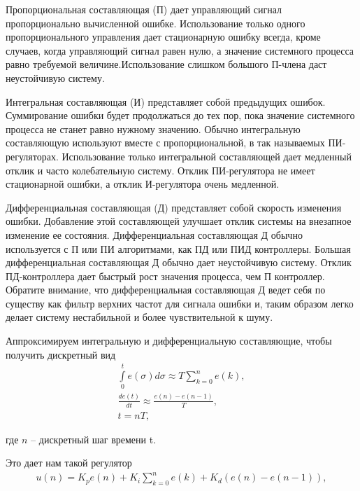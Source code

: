         Пропорциональная составляющая (П) дает управляющий сигнал
        пропорционально вычисленной ошибке. Использование только одного
        пропорционального управления дает стационарную ошибку всегда, кроме
        случаев, когда управляющий сигнал равен нулю, а значение системного
        процесса равно требуемой величине.Использование слишком большого
        П-члена даст неустойчивую систему. 

        Интегральная составляющая (И) представляет собой предыдущих ошибок.
        Суммирование ошибки будет продолжаться до тех пор, пока значение
        системного процесса не станет равно нужному значению. Обычно
        интегральную составляющую используют вместе с пропорциональной, в так
        называемых ПИ-регуляторах. Использование только интегральной
        составляющей дает медленный отклик и часто колебательную систему.
        Отклик ПИ-регулятора не имеет стационарной ошибки, а отклик
        И-регулятора очень медленной.

        Дифференциальная составляющая (Д) представляет собой скорость изменения
        ошибки. Добавление этой составляющей улучшает отклик системы на
        внезапное изменение ее состояния. Дифференциальная составляющая Д
        обычно используется с П или ПИ алгоритмами, как ПД или ПИД контроллеры.
        Большая дифференциальная составляющая Д обычно дает неустойчивую
        систему. Отклик ПД-контроллера дает быстрый рост значения процесса, чем
        П контроллер. Обратите внимание, что дифференциальная составляющая Д
        ведет себя по существу как фильтр верхних частот для сигнала ошибки и,
        таким образом легко делает систему нестабильной и более чувствительной
        к шуму.

        Аппроксимируем интегральную и дифференциальную составляющие, чтобы
        получить дискретный вид
        \begin{gather*}
            \int \limits_0^t e(\sigma)d\sigma \approx T \sum \limits_{k=0}^n e(k),\\
            \frac{de(t)}{dt} \approx \frac{e(n) - e(n - 1)}{T},\\
            t = nT,
        \end{gather*}

        где $n$ -- дискретный шаг времени t.

        Это дает нам такой регулятор
        \begin{gather*}
            u(n) = K_p e(n) + K_i \sum \limits_{k=0}^n e(k) + K_d (e(n)-e(n-1)),
        \end{gather*}

